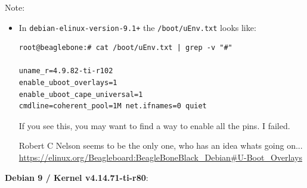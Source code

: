 \documentclass[
	fontsize=10pt
	paper=a4
]{scrartcl}
\begin{document}
Note:
\begin{footnotesize}
\begin{itemize}
\item In \texttt{debian-elinux-version-9.1+} the \texttt{/boot/uEnv.txt} looks like:
\begin{lstlisting}
root@beaglebone:# cat /boot/uEnv.txt | grep -v "#"

uname_r=4.9.82-ti-r102
enable_uboot_overlays=1
enable_uboot_cape_universal=1
cmdline=coherent_pool=1M net.ifnames=0 quiet
\end{lstlisting}

If you see this, you may want to find a way to enable all the pins. I failed.

Robert C Nelson seems to be the only one, who has an idea whats going on...
\url{https://elinux.org/Beagleboard:BeagleBoneBlack_Debian#U-Boot_Overlays}

\end{itemize}
\end{footnotesize}




\textbf{Debian 9 / Kernel v4.14.71-ti-r80}:
\end{document}

